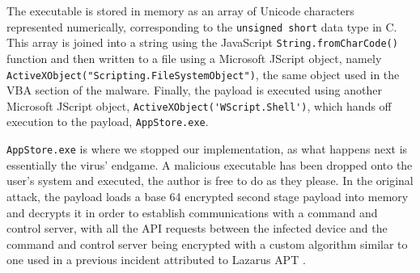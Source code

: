 The executable is stored in memory as an array of Unicode characters represented numerically, corresponding to the
\verb+unsigned short+ data type in C. This array is joined into a string using the JavaScript \verb+String.fromCharCode()+
function and then written to a file using a Microsoft JScript object, namely
\verb+ActiveXObject("Scripting.FileSystemObject")+, the same object used in the \acrshort{VBA} section of the malware.
Finally, the payload is executed using another Microsoft JScript object, \verb+ActiveXObject('WScript.Shell')+, which
hands off execution to the payload, \verb+AppStore.exe+.

\verb+AppStore.exe+ is where we stopped our implementation, as what happens next is essentially the virus' endgame. 
A malicious executable has been dropped onto the user's system and executed, the author is free to do as they please.
In the original attack, the payload loads a base 64 encrypted second stage payload into memory and decrypts it in order to
establish communications with a command and control server, with all the API requests between the infected device
and the command and control server being encrypted with a custom algorithm similar to one used in a previous incident
attributed to Lazarus \acrshort{APT} \cite{jazi-article}. 

\clearpage

